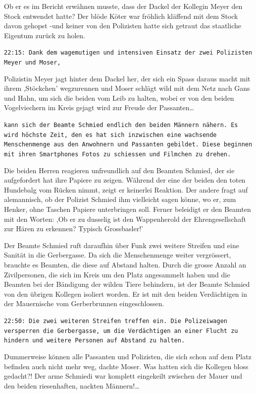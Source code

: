 \documentclass[11pt,titlepage,a5paper]{book}
\begin{document}
Ob er es im Bericht erwähnen musste, dass der Dackel der Kollegin Meyer den Stock entwendet hatte? Der blöde Köter war fröhlich kläffend mit dem Stock davon gehopst -und keiner von den Polizisten hatte sich getraut das staatliche Eigentum zurück zu holen.


{\tt 22:15: Dank dem wagemutigen und intensiven Einsatz der zwei Polizisten Meyer und Moser,}

Polizistin Meyer jagt hinter dem Dackel her, der sich ein Spass daraus macht mit ihrem ,Stöckchen' wegzurennen und Moser schlägt wild mit dem Netz nach Gans und Hahn, um sich die beiden vom Leib zu halten, wobei er von den beiden Vogelviechern im Kreis gejagt wird zur Freude der Passanten\dots

{\tt kann sich der Beamte Schmied endlich den beiden Männern nähern. Es wird höchste Zeit, den es hat sich inzwischen eine wachsende Menschenmenge aus den Anwohnern und Passanten gebildet. Diese beginnen mit ihren Smartphones Fotos zu schiessen und Filmchen zu drehen. 

Die beiden Herren reagieren unfreundlich auf den Beamten Schmied, der sie aufgefordert hat ihre Papiere zu zeigen. Während der eine der beiden den toten Hundebalg vom Rücken nimmt, zeigt er keinerlei Reaktion. Der andere fragt auf alemannisch, ob der Polizist Schmied ihm vielleicht sagen könne, wo er, zum Henker, ohne Taschen Papiere unterbringen soll. Ferner beleidigt er den Beamten mit den Worten: ,Ob er zu dusselig ist den Wappenherold der Ehrengesellschaft zur Hären zu erkennen? Typisch Grossbasler!'

Der Beamte Schmied ruft daraufhin über Funk zwei weitere Streifen und eine Sanität in die Gerbergasse. Da sich die Menschenmenge weiter vergrössert, brauchte es Beamten, die diese auf Abstand halten. Durch die grosse Anzahl an Zivilpersonen, die sich im Kreis um den Platz angesammelt haben und die Beamten bei der Bändigung der wilden Tiere behindern, ist der Beamte Schmied von den übrigen Kollegen isoliert worden. Er ist mit den beiden Verdächtigen in der Mauernische vom Gerberbrunnen eingeschlossen.}

{\tt 22:50: Die zwei weiteren Streifen treffen ein. Die Polizeiwagen versperren die Gerbergasse, um die Verdächtigen an einer Flucht zu hindern und weitere Personen auf Abstand zu halten.} 

Dummerweise können alle Passanten und Polizisten, die sich schon auf dem Platz befinden auch nicht mehr weg, dachte Moser. Was hatten sich die Kollegen bloss gedacht?! Der arme Schmiedi war komplett eingekeilt zwischen der Mauer und den beiden riesenhaften, nackten Männern!\dots 
\end{document}
